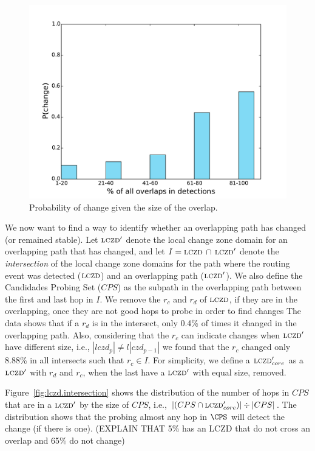 \begin{figure}
\begin{center}
\includegraphics[width=0.8\columnwidth]{figs/patching/probchange.pdf}
\caption{Probability of change given the size of the overlap. }
\label{fig:overlap.change.prob}
\end{center}
%
\end{figure}
%

We now want to find a way to identify whether an overlapping path
has changed (or remained stable).  Let $\mathrm{\textsc{lczd}}'$ denote the local
change zone domain for an overlapping path that has changed, and let
$I = \mathrm{\textsc{lczd}}\,\cap\,\mathrm{\textsc{lczd}}'$ denote the \emph{intersection} of the
local change zone domains for the path where the routing event was
detected ($\mathrm{\textsc{lczd}}$) and an overlapping path ($\mathrm{\textsc{lczd}}'$).
We also define the Candidades Probing Set ($CPS$) as the subpath 
in the overlapping path between the first and last hop in $I$.
We remove the $r_c$ and $r_d$ of $\mathrm{\textsc{lczd}}$, if they are in the overlapping,
once they are not good hops to probe in order to find changes
The data shows that if a $r_d$ is in the intersect, only 0.4\% of times
it changed in the overlapping path. Also, considering that the $r_c$ can
indicate changes when $\mathrm{\textsc{lczd}}'$ have different size, i.e., $|lczd_{p}| \ne l|czd_{p-1}| $ 
we found that the $r_c$ changed only 8.88\% in all intersects such that $r_c \in I$.
For simplicity, we define a $\mathrm{\textsc{lczd}}'_{core}$ as a $\mathrm{\textsc{lczd}}'$ with $r_d$ and $r_c$,
when the last have a $\mathrm{\textsc{lczd}}'$ with equal size, removed.


Figure~\ref{fig:lczd.intersection} shows the distribution of the
number of hops in $CPS$ that are in a $\mathrm{\textsc{lczd}}'$ by the
size of $CPS$,
i.e., $|(CPS \cap \mathrm{\textsc{lczd}}'_{core})| \div |CPS|$.  The distribution shows that the
probing almost any hop in
$\CPS$ will detect the change (if there is one). (EXPLAIN THAT 5\% has an LCZD
that do not cross an overlap and 65\% do not change)

